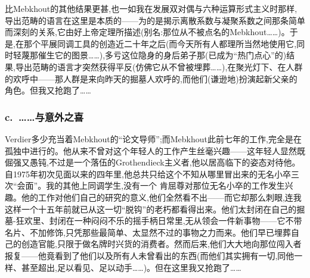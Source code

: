 比Mebkhout的其他结果更甚,也一如我在发展双对偶与六种运算形式主义时那样,导出范畴的语言在这里是本质的——为的是揭示离散系数与凝聚系数之间那条简单而深刻的关系,它由好上帝定理所描述(别名:那位从不被点名的Mebkhout……)。于是,在那个平展同调工具的创造近二十年之后(而今天所有人都理所当然地使用它,同时轻蔑那催生它的图景……),多亏这位隐身的身后弟子那(已成为“热门点心”的)结果,导出范畴的语言才突然获得平反(仿佛它从不曾被埋葬……),在聚光灯下、在人群的欢呼中——那人群是来向昨天的掘墓人欢呼的,而他们(谦逊地)扮演起新父亲的角色。但我又抢跑了……
\subsubsection*{c.~……与意外之喜}

Verdier多少充当着Mebkhout的“论文导师”;而Mebkhout此前七年的工作,完全是在孤独中进行的。他从来不曾对这个年轻人的工作产生丝毫兴趣——这年轻人显然既倔强又愚钝,不过是一个落伍的Grothendieck主义者,他以居高临下的姿态对待他。自1975年初次见面以来的四年里,他总共只给这个不知从哪里冒出来的无名小卒三次“会面”。我的其他上同调学生,没有一个
肯屈尊对那位无名小卒的工作发生兴趣。他的工作对他们自己的研究的意义,他们全然看不出——而它却那么刺眼,连我这样一个十五年前就已从这一切“脱钩”的老朽都看得出来。他们太封闭在自己的掘墓-狂欢里、封闭在一种闷闷不乐的摇手柄日常里,无从领会一件新事物——它不带名片、不加修饰,只凭那些最简单、太显然不过的事物之力而来。他们早已埋葬自己的创造官能,只限于做名牌时兴货的消费者。然而后来,他们大大地向那位闯入者报复——他竟看到了他们以及所有人未曾看出的东西(而他们其实拥有一切,同他一样、甚至超出,足以看见、足以动手……)。但在这里我又抢跑了……

